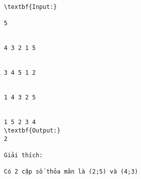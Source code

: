 \begin{verbatim}
\textbf{Input:}

5


4 3 2 1 5


3 4 5 1 2


1 4 3 2 5


1 5 2 3 4
\textbf{Output:}
2

Giải thích: 

Có 2 cặp số thỏa mãn là (2;5) và (4;3)\end{verbatim}